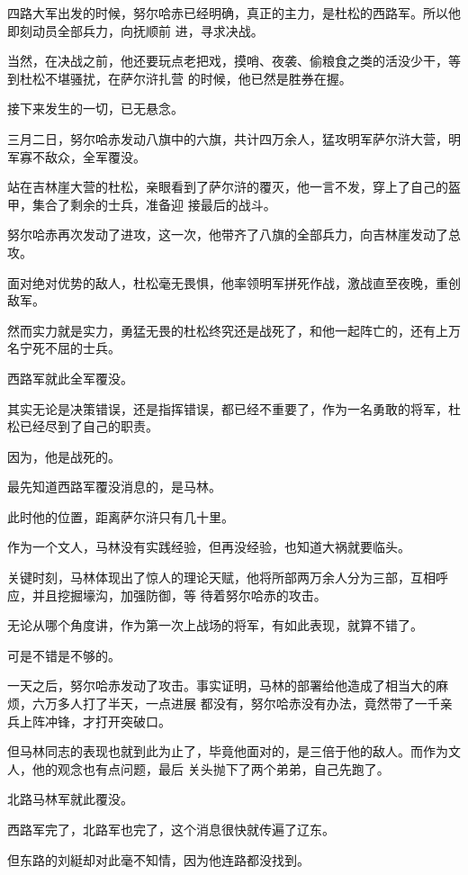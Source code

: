 \documentclass[11pt,a4paper,onecolumn]{article}
\begin{document}
四路大军出发的时候，努尔哈赤已经明确，真正的主力，是杜松的西路军。所以他即刻动员全部兵力，向抚顺前
进，寻求决战。

当然，在决战之前，他还要玩点老把戏，摸哨、夜袭、偷粮食之类的活没少干，等到杜松不堪骚扰，在萨尔浒扎营
的时候，他已然是胜券在握。

接下来发生的一切，已无悬念。

三月二日，努尔哈赤发动八旗中的六旗，共计四万余人，猛攻明军萨尔浒大营，明军寡不敌众，全军覆没。

站在吉林崖大营的杜松，亲眼看到了萨尔浒的覆灭，他一言不发，穿上了自己的盔甲，集合了剩余的士兵，准备迎
接最后的战斗。

努尔哈赤再次发动了进攻，这一次，他带齐了八旗的全部兵力，向吉林崖发动了总攻。

面对绝对优势的敌人，杜松毫无畏惧，他率领明军拼死作战，激战直至夜晚，重创敌军。

然而实力就是实力，勇猛无畏的杜松终究还是战死了，和他一起阵亡的，还有上万名宁死不屈的士兵。

西路军就此全军覆没。

其实无论是决策错误，还是指挥错误，都已经不重要了，作为一名勇敢的将军，杜松已经尽到了自己的职责。

因为，他是战死的。

最先知道西路军覆没消息的，是马林。

此时他的位置，距离萨尔浒只有几十里。

作为一个文人，马林没有实践经验，但再没经验，也知道大祸就要临头。

关键时刻，马林体现出了惊人的理论天赋，他将所部两万余人分为三部，互相呼应，并且挖掘壕沟，加强防御，等
待着努尔哈赤的攻击。

无论从哪个角度讲，作为第一次上战场的将军，有如此表现，就算不错了。

可是不错是不够的。

一天之后，努尔哈赤发动了攻击。事实证明，马林的部署给他造成了相当大的麻烦，六万多人打了半天，一点进展
都没有，努尔哈赤没有办法，竟然带了一千亲兵上阵冲锋，才打开突破口。

但马林同志的表现也就到此为止了，毕竟他面对的，是三倍于他的敌人。而作为文人，他的观念也有点问题，最后
关头抛下了两个弟弟，自己先跑了。

北路马林军就此覆没。

西路军完了，北路军也完了，这个消息很快就传遍了辽东。

但东路的刘綎却对此毫不知情，因为他连路都没找到。

\section[\thesection]{}
\end{document}
